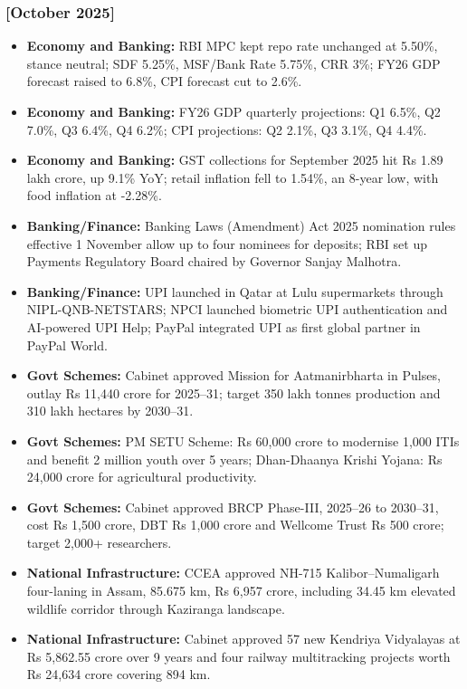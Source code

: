 \documentclass[10pt,a4paper]{article}
\newcommand{\monthtag}[1]{\textbf{[#1]}}
\begin{document}
\subsubsection{\monthtag{October 2025}}
\begin{itemize}
    \item \textbf{Economy and Banking:} RBI MPC kept repo rate unchanged at 5.50\%, stance neutral; SDF 5.25\%, MSF/Bank Rate 5.75\%, CRR 3\%; FY26 GDP forecast raised to 6.8\%, CPI forecast cut to 2.6\%.
    \item \textbf{Economy and Banking:} FY26 GDP quarterly projections: Q1 6.5\%, Q2 7.0\%, Q3 6.4\%, Q4 6.2\%; CPI projections: Q2 2.1\%, Q3 3.1\%, Q4 4.4\%.
    \item \textbf{Economy and Banking:} GST collections for September 2025 hit Rs 1.89 lakh crore, up 9.1\% YoY; retail inflation fell to 1.54\%, an 8-year low, with food inflation at -2.28\%.
    \item \textbf{Banking/Finance:} Banking Laws (Amendment) Act 2025 nomination rules effective 1 November allow up to four nominees for deposits; RBI set up Payments Regulatory Board chaired by Governor Sanjay Malhotra.
    \item \textbf{Banking/Finance:} UPI launched in Qatar at Lulu supermarkets through NIPL-QNB-NETSTARS; NPCI launched biometric UPI authentication and AI-powered UPI Help; PayPal integrated UPI as first global partner in PayPal World.
    \item \textbf{Govt Schemes:} Cabinet approved Mission for Aatmanirbharta in Pulses, outlay Rs 11,440 crore for 2025--31; target 350 lakh tonnes production and 310 lakh hectares by 2030--31.
    \item \textbf{Govt Schemes:} PM SETU Scheme: Rs 60,000 crore to modernise 1,000 ITIs and benefit 2 million youth over 5 years; Dhan-Dhaanya Krishi Yojana: Rs 24,000 crore for agricultural productivity.
    \item \textbf{Govt Schemes:} Cabinet approved BRCP Phase-III, 2025--26 to 2030--31, cost Rs 1,500 crore, DBT Rs 1,000 crore and Wellcome Trust Rs 500 crore; target 2,000+ researchers.
    \item \textbf{National Infrastructure:} CCEA approved NH-715 Kalibor--Numaligarh four-laning in Assam, 85.675 km, Rs 6,957 crore, including 34.45 km elevated wildlife corridor through Kaziranga landscape.
    \item \textbf{National Infrastructure:} Cabinet approved 57 new Kendriya Vidyalayas at Rs 5,862.55 crore over 9 years and four railway multitracking projects worth Rs 24,634 crore covering 894 km.

\end{itemize}
\end{document}

